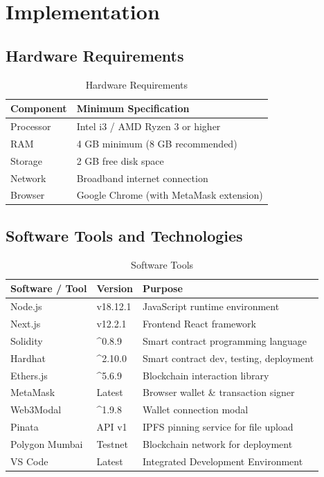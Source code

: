 \documentclass[12pt,a4paper]{report}
\begin{document}
\chapter{Implementation}

\section{Hardware Requirements}

\begin{table}[H]
\centering
\begin{tabular}{ll}
\toprule
\textbf{Component} & \textbf{Minimum Specification} \\
\midrule
Processor & Intel i3 / AMD Ryzen 3 or higher \\
RAM       & 4 GB minimum (8 GB recommended) \\
Storage   & 2 GB free disk space \\
Network   & Broadband internet connection \\
Browser   & Google Chrome (with MetaMask extension) \\
\bottomrule
\end{tabular}
\caption{Hardware Requirements}
\end{table}

\section{Software Tools and Technologies}

\begin{table}[H]
\centering
\begin{tabular}{lll}
\toprule
\textbf{Software / Tool} & \textbf{Version} & \textbf{Purpose} \\
\midrule
Node.js      & v18.12.1  & JavaScript runtime environment \\
Next.js      & v12.2.1   & Frontend React framework \\
Solidity     & \^{}0.8.9 & Smart contract programming language \\
Hardhat      & \^{}2.10.0 & Smart contract dev, testing, deployment \\
Ethers.js    & \^{}5.6.9 & Blockchain interaction library \\
MetaMask     & Latest    & Browser wallet \& transaction signer \\
Web3Modal    & \^{}1.9.8 & Wallet connection modal \\
Pinata       & API v1    & IPFS pinning service for file upload \\
Polygon Mumbai & Testnet & Blockchain network for deployment \\
VS Code      & Latest    & Integrated Development Environment \\
\bottomrule
\end{tabular}
\caption{Software Tools}
\end{table}
\end{document}
